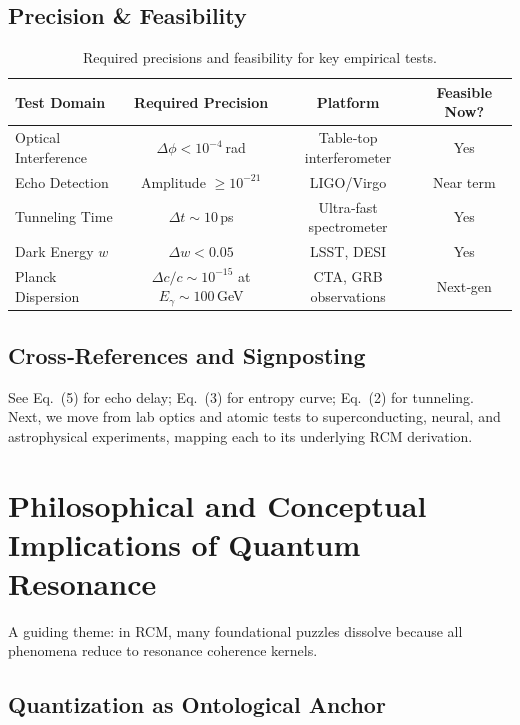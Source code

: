 \subsection{Precision \& Feasibility}

\begin{table}[H]
  \centering
  \begin{tabular}{lccc}
    \toprule
    Test Domain             & Required Precision                     & Platform                          & Feasible Now? \\
    \midrule
    Optical Interference     & $\Delta\phi<10^{-4}$ rad              & Table‐top interferometer          & Yes           \\
    Echo Detection           & Amplitude $\ge10^{-21}$               & LIGO/Virgo                        & Near term     \\
    Tunneling Time           & $\Delta t\sim10\,$ps                  & Ultra‐fast spectrometer           & Yes           \\
    Dark Energy $w$          & $\Delta w<0.05$                       & LSST, DESI                        & Yes           \\
    Planck Dispersion        & $\Delta c/c\sim10^{-15}$ at $E_\gamma\sim100\,$GeV & CTA, GRB observations   & Next‐gen      \\
    \bottomrule
  \end{tabular}
  \caption{Required precisions and feasibility for key empirical tests.}
\end{table}

\subsection{Cross‐References and Signposting}

See Eq.~(5) for echo delay; Eq.~(3) for entropy curve; Eq.~(2) for tunneling.  
Next, we move from lab optics and atomic tests to superconducting, neural, and astrophysical experiments, mapping each to its underlying RCM derivation.

\section{Philosophical and Conceptual Implications of Quantum Resonance}

A guiding theme: in RCM, many foundational puzzles dissolve because all phenomena reduce to resonance coherence kernels.

\subsection{Quantization as Ontological Anchor}

